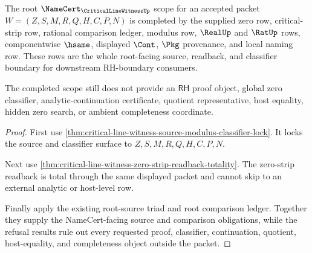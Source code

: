 \begin{theorem}
\label{thm:critical-line-witness-root-namecert-scope-completion}
The root $\NameCert_{\CriticalLineWitnessUp}$ scope for an accepted packet $W=(Z,S,M,R,Q,H,C,P,N)$ is completed by the supplied zero row, critical-strip row, rational comparison ledger, modulus row, $\RealUp$ and $\RatUp$ rows, componentwise $\hsame$, displayed $\Cont$, $\Pkg$ provenance, and local naming row. These rows are the whole root-facing source, readback, and classifier boundary for downstream RH-boundary consumers.

The completed scope still does not provide an $\mathsf{RH}$ proof object, global zero classifier, analytic-continuation certificate, quotient representative, host equality, hidden zero search, or ambient completeness coordinate.
\end{theorem}
\begin{proof}
First use \autoref{thm:critical-line-witness-source-modulus-classifier-lock}. It locks the source and classifier surface to $Z,S,M,R,Q,H,C,P,N$.

Next use \autoref{thm:critical-line-witness-zero-strip-readback-totality}. The zero-strip readback is total through the same displayed packet and cannot skip to an external analytic or host-level row.

Finally apply the existing root-source triad and root comparison ledger. Together they supply the NameCert-facing source and comparison obligations, while the refusal results rule out every requested proof, classifier, continuation, quotient, host-equality, and completeness object outside the packet.
\end{proof}
